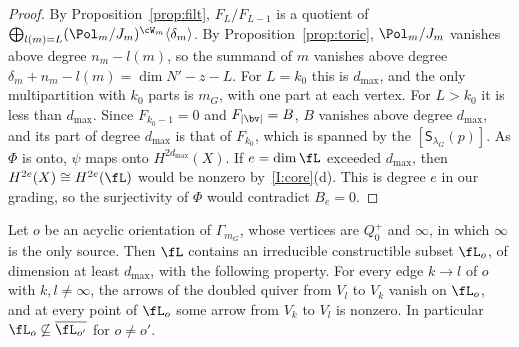 \documentclass[11pt]{amsart}
\begin{document}
\begin{proof}
By Proposition~\ref{prop:filt}, $F_L/F_{L-1}$ is a quotient of
$\bigoplus_{l(m)=L}(\Pol_m/J_m)^{\cW_m}\langle\delta_m\rangle$.  By
Proposition~\ref{prop:toric}, $\Pol_m/J_m$ vanishes above degree
$n_m-l(m)$, so the summand of $m$ vanishes above degree
$\delta_m+n_m-l(m)=\dim N'-z-L$.  For $L=k_0$ this is $d_{\max}$, and the only
multipartition with $k_0$ parts is $m_G$, with one part at each vertex.  For
$L>k_0$ it is less than $d_{\max}$.  Since $F_{k_0-1}=0$ and $F_{|\bv|}=B$,
$B$ vanishes above degree $d_{\max}$, and its part of degree $d_{\max}$ is
that of $F_{k_0}$, which is spanned by the $[\mathsf S_{\lambda_G}(p)]$.  As
$\Phi$ is onto, $\psi$ maps onto $H^{2d_{\max}}(X)$.  If
$e=\dim\fL$ exceeded $d_{\max}$, then $H^{2e}(X)\cong H^{2e}(\fL)$ would be
nonzero by~\ref{I:core}(d).  This is degree $e$ in our grading, so the
surjectivity of $\Phi$ would contradict $B_e=0$.
\end{proof}

\begin{lemma}\label{lem:comp}
Let $o$ be an acyclic orientation of $\Gamma_{m_G}$, whose vertices are
$Q_0^+$ and $\infty$, in which $\infty$ is the only source.  Then $\fL$ contains an irreducible constructible subset
$\fL_o$, of dimension at least $d_{\max}$, with the following property.  For
every edge $k\to l$ of $o$ with $k,l\neq\infty$, the arrows of the doubled
quiver from $V_l$ to $V_k$ vanish on $\fL_o$, and at every point of $\fL_o$
some arrow from $V_k$ to $V_l$ is nonzero.  In particular
$\fL_o\not\subseteq\overline{\fL_{o'}}$ for $o\neq o'$.
\end{lemma}
\end{document}
